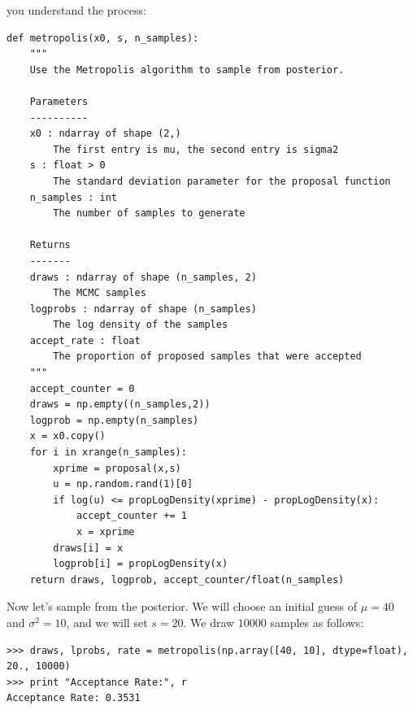 you understand the process:
\begin{lstlisting}
def metropolis(x0, s, n_samples):
    """
    Use the Metropolis algorithm to sample from posterior.

    Parameters
    ----------
    x0 : ndarray of shape (2,)
        The first entry is mu, the second entry is sigma2
    s : float > 0
        The standard deviation parameter for the proposal function
    n_samples : int
        The number of samples to generate

    Returns
    -------
    draws : ndarray of shape (n_samples, 2)
        The MCMC samples
    logprobs : ndarray of shape (n_samples)
        The log density of the samples
    accept_rate : float
        The proportion of proposed samples that were accepted
    """
    accept_counter = 0
    draws = np.empty((n_samples,2))
    logprob = np.empty(n_samples)
    x = x0.copy()
    for i in xrange(n_samples):
        xprime = proposal(x,s)
        u = np.random.rand(1)[0]
        if log(u) <= propLogDensity(xprime) - propLogDensity(x):
            accept_counter += 1
            x = xprime
        draws[i] = x
        logprob[i] = propLogDensity(x)
    return draws, logprob, accept_counter/float(n_samples)
\end{lstlisting}
Now let's sample from the posterior. We will choose an initial guess of $\mu=40$ and $\sigma^2=10$,
and we will set $s = 20$. We draw $10000$ samples as follows:
\begin{lstlisting}
>>> draws, lprobs, rate = metropolis(np.array([40, 10], dtype=float), 20., 10000)
>>> print "Acceptance Rate:", r
Acceptance Rate: 0.3531
\end{lstlisting}

